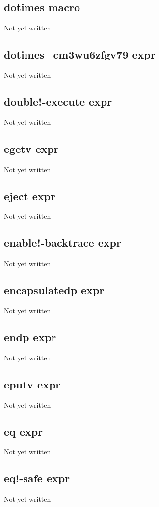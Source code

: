\documentclass[a4paper,11pt]{article}
\begin{document}
\subsection{\ttfamily dotimes macro}
Not yet written

\subsection{\ttfamily dotimes\_cm3wu6zfgv79 expr}
Not yet written

\subsection{\ttfamily double!-execute expr}
Not yet written

\subsection{\ttfamily egetv expr}
Not yet written

\subsection{\ttfamily eject expr}
Not yet written

\subsection{\ttfamily enable!-backtrace expr}
Not yet written

\subsection{\ttfamily encapsulatedp expr}
Not yet written

\subsection{\ttfamily endp expr}
Not yet written

\subsection{\ttfamily eputv expr}
Not yet written

\subsection{\ttfamily eq expr}
Not yet written

\subsection{\ttfamily eq!-safe expr}
Not yet written
\end{document}
